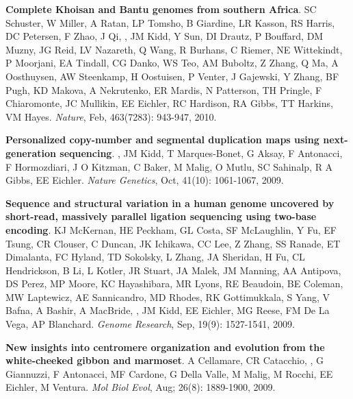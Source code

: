 \vspace{-.2cm}
    {\bf Complete Khoisan and Bantu genomes from southern Africa}.
    SC Schuster, W Miller, A Ratan, LP Tomsho, B Giardine, LR Kasson, RS
    Harris, DC Petersen, F Zhao, J Qi, \calkan{}, JM Kidd, Y Sun, DI Drautz, 
    P Bouffard, DM Muzny, JG Reid, LV Nazareth, Q Wang, R Burhans, C Riemer, 
    NE Wittekindt, P Moorjani, EA Tindall, CG Danko, WS Teo, AM Buboltz, 
    Z Zhang, Q Ma, A Oosthuysen, AW Steenkamp, H Oostuisen, P Venter, J 
    Gajewski, Y Zhang, BF Pugh, KD Makova, A Nekrutenko, ER Mardis, N Patterson, 
    TH Pringle, F Chiaromonte, JC Mullikin, EE Eichler, RC Hardison, RA Gibbs, TT 
    Harkins, VM Hayes. 
    {\em Nature}, Feb, 463(7283): 943-947, 2010.
    
\vspace{-.2cm}
    {\bf Personalized copy-number and segmental duplication maps using next-generation sequencing}.
    \calkan{}, JM Kidd, T Marques-Bonet, G Aksay, F Antonacci, F Hormozdiari, J O Kitzman, 
    C Baker, M Malig, O Mutlu, SC Sahinalp, R A Gibbs, EE Eichler.  
    {\em Nature Genetics},  Oct, 41(10): 1061-1067, 2009.\\
    
\vspace{-.2cm}
    {\bf Sequence and structural variation in a human genome uncovered by short-read, massively parallel ligation sequencing using two-base encoding}.
    KJ McKernan, HE Peckham, GL Costa, SF McLaughlin, Y Fu, EF Tsung, CR Clouser, C Duncan, JK Ichikawa, CC Lee, Z Zhang, 
    SS Ranade, ET Dimalanta,  FC Hyland, TD Sokolsky, L Zhang, JA Sheridan, H Fu, CL Hendrickson, B Li, L Kotler, JR Stuart, 
    JA Malek, JM Manning, AA Antipova, DS Perez, MP Moore, KC Hayashibara, MR Lyons, RE Beaudoin, BE Coleman, MW Laptewicz, 
    AE Sannicandro, MD Rhodes, RK Gottimukkala, S Yang, V Bafna, A Bashir, A MacBride, \calkan{}, JM Kidd, EE Eichler, 
    MG Reese, FM De La Vega, AP Blanchard. 
    {\em Genome Research}, Sep, 19(9): 1527-1541, 2009.  

\vspace{-.2cm}
    {\bf  New insights into centromere organization and evolution from the white-cheeked gibbon and marmoset}.
    A Cellamare,    CR Catacchio,  \calkan{}, G Giannuzzi, F Antonacci, MF Cardone, G Della Valle, M Malig, M Rocchi, EE Eichler, M Ventura.
    {\em Mol Biol Evol}, Aug; 26(8): 1889-1900, 2009.
    

